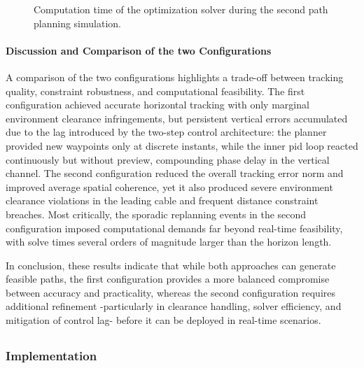 \begin{figure}
	\centering
	\caption{Computation time of the optimization solver during the second path planning simulation.}
	\label{rcc_s_pp_r_sc_compute_time}
\end{figure}

\paragraph{Discussion and Comparison of the two Configurations}

A comparison of the two configurations highlights a trade-off between tracking quality, constraint
robustness, and computational feasibility. The first configuration achieved accurate horizontal
tracking with only marginal environment clearance infringements, but persistent vertical errors
accumulated due to the lag introduced by the two-step control architecture: the planner provided
new waypoints only at discrete instants, while the inner \ac{pid} loop reacted continuously but
without preview, compounding phase delay in the vertical channel. The second configuration reduced
the overall tracking error norm and improved average spatial coherence, yet it also produced severe
environment clearance violations in the leading cable and frequent distance constraint breaches.
Most critically, the sporadic replanning events in the second configuration imposed computational
demands far beyond real-time feasibility, with solve times several orders of magnitude larger than
the horizon length.

In conclusion, these results indicate that while both approaches can generate feasible paths, the
first configuration provides a more balanced compromise between accuracy and practicality, whereas
the second configuration requires additional refinement -particularly in clearance handling, solver
efficiency, and mitigation of control lag- before it can be deployed in real-time scenarios.

\subsection{}
\label{rcc_s_model_predictive_control}

\subsubsection{Implementation}
\label{rcc_s_mpc_implementation}

